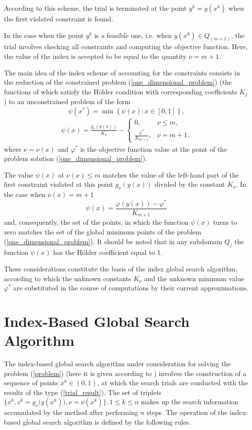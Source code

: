 \documentclass[review]{elsarticle}
\begin{document}
	According to this scheme, the trial is terminated at the point $y^k=y(x^k)$ when the first violated constraint  is found.
	
	In the case when the point $y^k$ is a feasible one, i.e. when $y(x^k) \in Q_(m+1)$, the trial involves checking all constraints and computing the objective function. Here, the value of the index is accepted to be equal to the quantity $\nu = m+1$.
	
	The main idea of the index scheme of accounting for the constraints consists in the reduction of the constrained problem (\ref{one_dimensional_problem}) (the functions of which satisfy the H\"{o}lder condition with corresponding coefficients $K_j$) to an unconstrained problem of the form
\begin{equation}\label{reduction_problem}
	\psi(x^*)=\min \left\{\psi(x): x \in [0,1] \right\},
\end{equation}
\begin{eqnarray} \nonumber
	\psi(x)=\frac{g_{\nu}(y(x))}{K_{\nu}} - 
	\left\{
   \begin{array}{lr}
     0, & \nu \leq m,\\
     \frac{\varphi^\ast}{K_{m+1}}, & \nu = m + 1.
   \end{array}
	\right.
\end{eqnarray}
where $\nu = \nu(x)$ and $\varphi^\ast$ is the objective function value at the point of the problem solution (\ref{one_dimensional_problem}).

	The value $\psi(x)$ at $\nu(x) \leq m$ matches the value of the left-hand part of the first constraint violated at this point $g_{\nu}(y(x))$ divided by the constant $K_{\nu}$. In the case when $\nu(x) = m+1$ 
$$
	\psi(x)=\frac{\varphi(y(x))-\varphi^\ast}{K_{m+1}}
$$
and, consequently, the set of the points, in which the function $\psi(x)$ turns to zero matches the set of the global minimum points of the problem (\ref{one_dimensional_problem}). It should be noted that in any subdomain $Q_j$ the function $\psi(x)$ has the H\"{o}lder coefficient equal to 1.
	
	These considerations constitute the basis of the index global search algorithm, according to which the unknown constants $K_{\nu}$ and the unknown minimum value $\varphi^\ast$ are substituted in the course of computations by their current approximations.



\section{Index-Based Global Search Algorithm}
	The index-based global search algorithm under consideration for solving the problem (\ref{problem}) (here it is given according to \cite{Strongin2000}) involves the construction of a sequence of points $x^k \in (0,1)$, at which the search trials are conducted with the results of the type (\ref{trial_result}). The set of triplets $\{x^k, z^k=g_{\nu}\big(y(x^k)\big), \nu=\nu(x^k)\}, 1 \leq k \leq n$  makes up the search information accumulated by the method after performing $n$ steps. The operation of the index-based global search algorithm is defined by the following rules.
	
\end{document}

